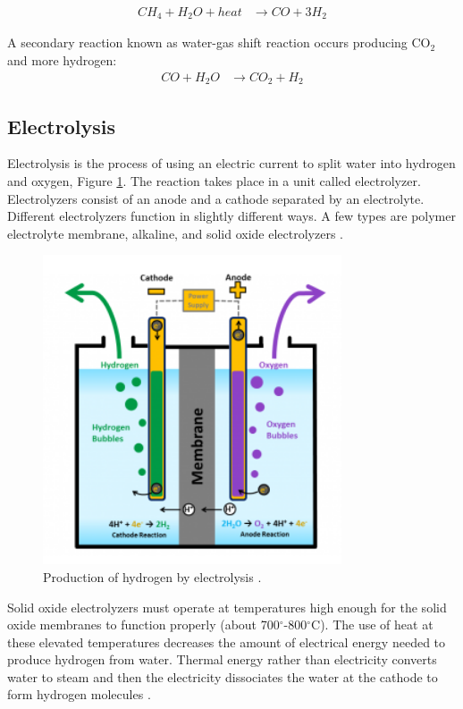 \documentclass{anstrans}
\begin{document}
\begin{align}
CH_4 + H_2O + heat & \rightarrow CO + 3H_2
\label{eq:1}
\end{align}

A secondary reaction known as water-gas shift reaction occurs producing CO$_2$ and more hydrogen:
\begin{align}
CO + H_2O & \rightarrow CO_2 + H_2
\label{eq:2}
\end{align}

\subsection{Electrolysis}

Electrolysis is the process of using an electric current to split water into hydrogen and oxygen, Figure \ref{fig:electro}. The reaction takes place in a unit called electrolyzer. Electrolyzers consist of an anode and a cathode separated by an electrolyte. Different electrolyzers function in slightly different ways. A few types are polymer electrolyte membrane, alkaline, and solid oxide electrolyzers \cite{noauthor_hydrogen_nodate}.

\begin{figure}[]
	\centering
	\includegraphics[width=0.55\linewidth]{figures/electrolysis.png}
	\hfill
	\caption{Production of hydrogen by electrolysis \cite{noauthor_hydrogen_nodate}.}
	\label{fig:electro}
\end{figure}

Solid oxide electrolyzers must operate at temperatures high enough for the solid oxide membranes to function properly (about 700$^{\circ}$-800$^{\circ}$C). The use of heat at these elevated temperatures decreases the amount of electrical energy needed to produce hydrogen from water.
Thermal energy rather than electricity converts water to steam and then the electricity dissociates the water at the cathode to form hydrogen molecules \cite{xu_introduction_2017}.
\end{document}
